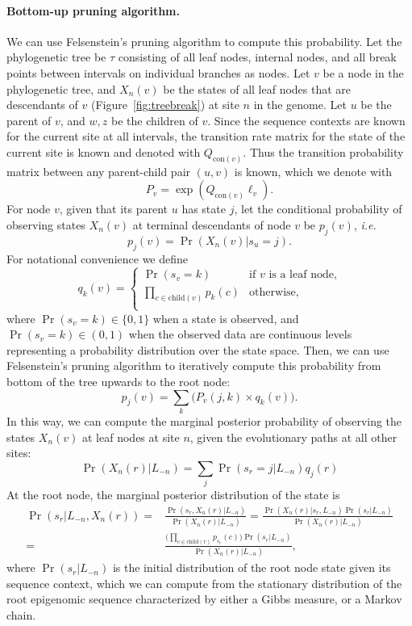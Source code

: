\documentclass[11pt]{article}
\newcommand{\context}{\ensuremath{\mathrm{con}}}
\newcommand{\child}[1]{\ensuremath{\mathrm{child}(#1)}}
\begin{document}
\paragraph{Bottom-up pruning algorithm.}
We can use Felsenstein's pruning algorithm to compute this
probability.  Let the phylogenetic tree be $\tau$ consisting of all
leaf nodes, internal nodes, and all break points between intervals on
individual branches as nodes.  Let $v$ be a node in the phylogenetic
tree, and $X_n(v)$ be the states of all leaf nodes that are
descendants of $v$ (Figure~\ref{fig:treebreak}) at site $n$ in the
genome. Let $u$ be the parent of $v$, and $w, z$ be the children of
$v$. Since the sequence contexts are known for the current site at all
intervals, the transition rate matrix for the state of the current
site is known and denoted with $Q_{\context{}(v)}$. Thus the
transition probability matrix between any parent-child pair $(u,v)$ is
known, which we denote with
\[
P_v = \exp(Q_{\context{}(v)}\ell_v).
\]
For node $v$, given that its parent $u$ has state $j$, let the
conditional probability of observing states $X_n(v)$ at
terminal descendants of node $v$ be $p_j(v)$, \textit{i.e.}
\[
p_j(v) = \Pr(X_n(v) | s_u=j).
\]
For notational convenience we define
\[
q_k(v) = \left\{
  \begin{array}{ll}
    \Pr(s_v = k) & \mbox{if $v$ is a leaf node,} \\
    \prod_{c\in \child{v}}  p_{k}(c) & \mbox{otherwise,} \\
  \end{array}\right.
\]
where $\Pr(s_v = k) \in \{0, 1\}$ when a state is observed, and
$\Pr(s_v = k) \in (0,1)$ when the observed data are continuous levels
representing a probability distribution over the state space. Then, we
can use Felsenstein's pruning algorithm to iteratively compute this probability
from bottom of the tree upwards to the root node:
\begin{equation}
  p_j(v) = \textstyle{\sum_{k}} \big(P_v(j,k) \times q_k(v)\big).
\end{equation}
In this way, we can compute the marginal posterior probability of observing the
states $X_n(v)$ at leaf nodes at site $n$, given the evolutionary
paths at all other sites:
\begin{equation}\label{eqn:leafmarginal}
\Pr(X_n(r) | L_{-n}) = \sum_j\Pr(s_r=j |L_{-n}) q_j(r)
\end{equation}
At the root node, the marginal posterior distribution of the state is
\begin{equation} \label{eqn:rootposterior}
\begin{aligned}
\Pr(s_r| L_{-n}, X_n(r)) = & \frac{\Pr(s_r, X_n(r)|L_{-n})}{\Pr(X_n(r)| L_{-n})} = \frac{\Pr(X_n(r)|s_r, L_{-n}) \Pr(s_r|L_{-n})}{\Pr(X_n(r)| L_{-n}) }  \\
= & \frac{ \big(\prod_{c\in \child{r}}  p_{s_r}(c)\big) \Pr(s_r|L_{-n})}{\Pr(X_n(r)| L_{-n}) },
\end{aligned}
\end{equation}
where $\Pr(s_r|L_{-n})$ is the initial distribution of the root node
state given its sequence context, which we can compute from the
stationary distribution of the root epigenomic sequence characterized
by either a Gibbs measure, or a Markov chain.
\end{document}
